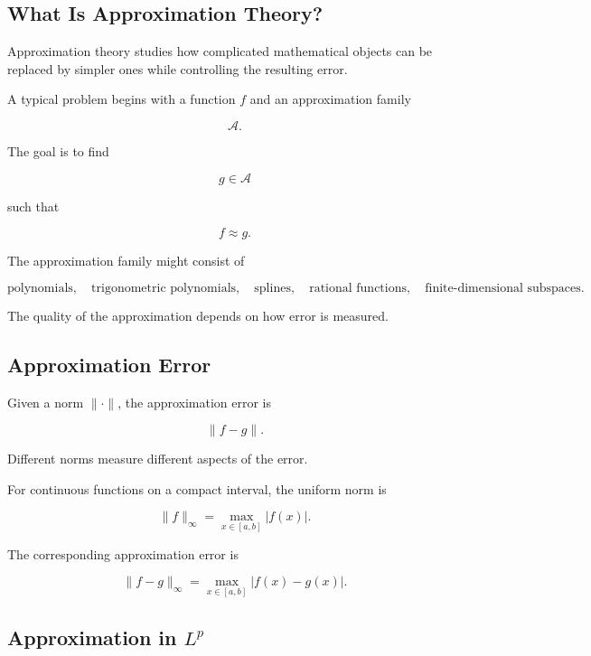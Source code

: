 \subsection{What Is Approximation Theory?}
\label{subsec:what-is-approximation-theory}

Approximation theory studies how complicated mathematical objects can be
replaced by simpler ones while controlling the resulting error.

A typical problem begins with a function \(f\) and an approximation
family

\[
\mathcal{A}.
\]

The goal is to find

\[
g\in\mathcal{A}
\]

such that

\[
\boxed{
f\approx g.
}
\]

The approximation family might consist of

\[
\boxed{
\text{polynomials},
\quad
\text{trigonometric polynomials},
\quad
\text{splines},
\quad
\text{rational functions},
\quad
\text{finite-dimensional subspaces}.
}
\]

The quality of the approximation depends on how error is measured.

\subsection{Approximation Error}
\label{subsec:approximation-error}

Given a norm \(\|\cdot\|\), the approximation error is

\[
\boxed{
\|f-g\|.
}
\]

Different norms measure different aspects of the error.

For continuous functions on a compact interval, the uniform norm is

\[
\boxed{
\|f\|_\infty
=
\max_{x\in[a,b]}|f(x)|.
}
\]

The corresponding approximation error is

\[
\boxed{
\|f-g\|_\infty
=
\max_{x\in[a,b]}|f(x)-g(x)|.
}
\]

\subsection{Approximation in \(L^p\)}
\label{subsec:approximation-lp}

